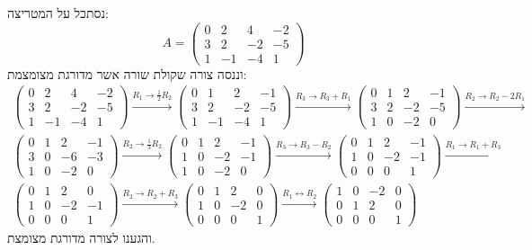 \documentclass{tstextbook}
\begin{document}
\begin{example}
נסתכל על המטריצה:
$$A=\begin{pmatrix} 0 & 2 & 4 & -2 \\3 & 2 & -2 & -5 \\1 & -1 & -4 & 1\end{pmatrix}$$
וננסה צורה שקולת שורה אשר מדורגת מצומצמת:
$$\begin{gather}\begin{pmatrix}0 & 2 & 4 & -2 \\3 & 2 & -2 & -5 \\1 & -1 & -4 & 1\end{pmatrix}\xrightarrow{R_{1}\to \frac{1}{2}R_{2}}\begin{pmatrix}0 & 1 & 2 & -1 \\3 & 2 & -2 & -5 \\1 & -1 & -4 & 1\end{pmatrix}\xrightarrow{R_{3}\to  R_{3}+R_{1}}\begin{pmatrix}0 & 1 & 2 & -1 \\3 & 2 & -2 & -5 \\1 & 0 & -2 & 0\end{pmatrix}\xrightarrow{R_{2}\to R_{2}-2R_{1}} \\\begin{pmatrix}0 & 1 & 2 & -1 \\3 & 0 & -6 & -3 \\1 & 0 & -2 & 0\end{pmatrix}\xrightarrow{R_{2}\to \frac{1}{3}R_{2}}\begin{pmatrix}0 & 1 & 2 & -1 \\1 & 0 & -2 & -1 \\1 & 0 & -2 & 0\end{pmatrix}\xrightarrow{R_{3}\to R_{3}-R_{2}}\begin{pmatrix}0 & 1 & 2 & -1 \\1 & 0 & -2 & -1 \\0 & 0 & 0 & 1\end{pmatrix}\xrightarrow{R_{1}\to R_{1}+R_{3}} \\\begin{pmatrix}0 & 1 & 2 & 0 \\1 & 0 & -2 & -1 \\0 & 0 & 0 & 1\end{pmatrix}\xrightarrow{R_{2}\to R_{2}+R_{3}}\begin{pmatrix}0 & 1 & 2 & 0 \\1 & 0 & -2 & 0 \\0 & 0 & 0 & 1\end{pmatrix}\xrightarrow{R_{1}\leftrightarrow  R_{2}}\begin{pmatrix}1 & 0 & -2 & 0 \\0 & 1 & 2 & 0 \\0 & 0 & 0 & 1\end{pmatrix}
\end{gather}$$
והגענו לצורה מדורגת מצומצת. 

\end{example}
\end{document}
